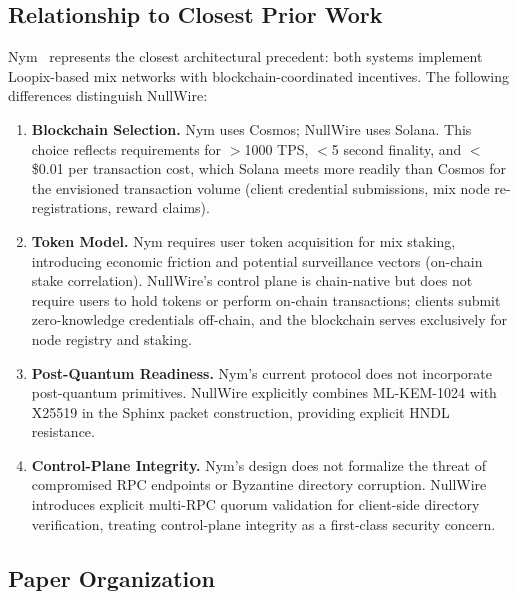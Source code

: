 \documentclass[11pt]{article}
\theoremstyle{definition}
\theoremstyle{remark}
\begin{document}
\subsection{Relationship to Closest Prior Work}\label{subsec:closest-work}

Nym~\cite{nym2020} represents the closest architectural precedent: both systems implement Loopix-based mix networks with blockchain-coordinated incentives. The following differences distinguish NullWire:

\begin{enumerate}
    \item \textbf{Blockchain Selection.} Nym uses Cosmos; NullWire uses Solana. This choice reflects requirements for $>$1000 TPS, $<$5 second finality, and $<$\$0.01 per transaction cost, which Solana meets more readily than Cosmos for the envisioned transaction volume (client credential submissions, mix node re-registrations, reward claims).

    \item \textbf{Token Model.} Nym requires user token acquisition for mix staking, introducing economic friction and potential surveillance vectors (on-chain stake correlation). NullWire's control plane is chain-native but does not require users to hold tokens or perform on-chain transactions; clients submit zero-knowledge credentials off-chain, and the blockchain serves exclusively for node registry and staking.

    \item \textbf{Post-Quantum Readiness.} Nym's current protocol does not incorporate post-quantum primitives. NullWire explicitly combines ML-KEM-1024 with X25519 in the Sphinx packet construction, providing explicit HNDL resistance.

    \item \textbf{Control-Plane Integrity.} Nym's design does not formalize the threat of compromised RPC endpoints or Byzantine directory corruption. NullWire introduces explicit multi-RPC quorum validation for client-side directory verification, treating control-plane integrity as a first-class security concern.
\end{enumerate}

\subsection{Paper Organization}
\end{document}

